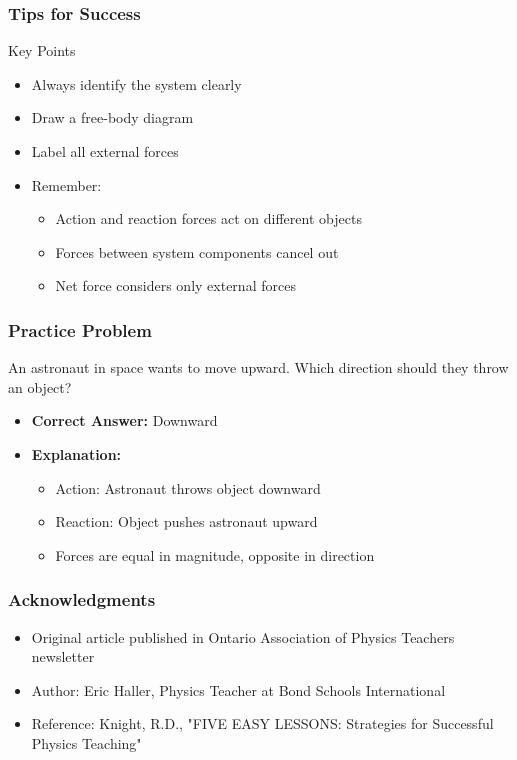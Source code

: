 \documentclass{beamer}
\begin{document}
\begin{frame}
\frametitle{Tips for Success}
\begin{block}{Key Points}
\begin{itemize}
    \item Always identify the system clearly
    \item Draw a free-body diagram
    \item Label all external forces
    \item Remember:
    \begin{itemize}
        \item Action and reaction forces act on different objects
        \item Forces between system components cancel out
        \item Net force considers only external forces
    \end{itemize}
\end{itemize}
\end{block}
\end{frame}

\begin{frame}
\frametitle{Practice Problem}
An astronaut in space wants to move upward. Which direction should they throw an object?
\end{frame}

\begin{frame}
\begin{itemize}
    \item \textbf{Correct Answer:} Downward
    \item \textbf{Explanation:}
    \begin{itemize}
        \item Action: Astronaut throws object downward
        \item Reaction: Object pushes astronaut upward
        \item Forces are equal in magnitude, opposite in direction
    \end{itemize}
\end{itemize}
\end{frame}



\begin{frame}
\frametitle{Acknowledgments}
\begin{itemize}
    \item Original article published in Ontario Association of Physics Teachers newsletter
    \item Author: Eric Haller, Physics Teacher at Bond Schools International
    \item Reference: Knight, R.D., "FIVE EASY LESSONS: Strategies for Successful Physics Teaching"
\end{itemize}
\end{frame}
\end{document}
